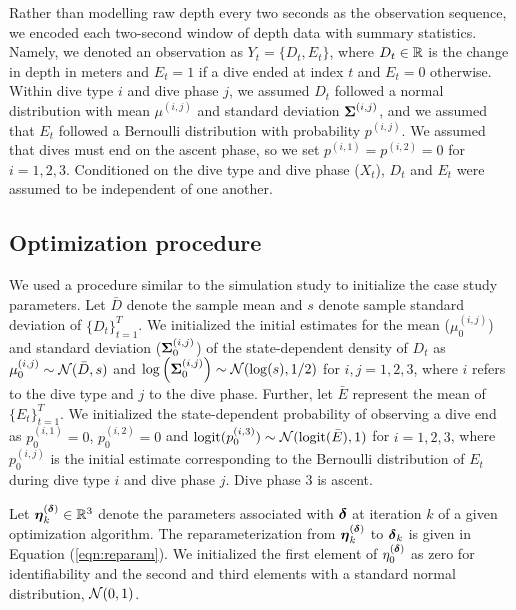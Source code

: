 Rather than modelling raw depth every two seconds as the observation sequence, we encoded each two-second window of depth data with summary statistics. Namely, we denoted an observation as $Y_t = \{D_t,E_t\}$, where $D_t \in \mathbb{R}$ is the change in depth in meters and $E_t = 1$ if a dive ended at index $t$ and $E_t = 0$ otherwise. 
Within dive type $i$ and dive phase $j$, we assumed $D_t$ followed a normal distribution with mean $\mu^{(i,j)}$ and standard deviation $\boldsymbol{\Sigma}^{(i,j)}$, and we assumed that $E_t$ followed a Bernoulli distribution with probability $p^{(i,j)}$. We assumed that dives must end on the ascent phase, so we set $p^{(i,1)} = p^{(i,2)} = 0$ for $i = 1,2,3$. Conditioned on the dive type and dive phase ($X_t$), $D_t$ and $E_t$ were assumed to be independent of one another.

\subsection{Optimization procedure}

We used a procedure similar to the simulation study to initialize the case study parameters. Let $\bar D$ denote the sample mean and $s$ denote sample standard deviation of $\{D_t\}_{t=1}^T$. We initialized the initial estimates for the mean ($\mu^{(i,j)}_0$) and standard deviation ($\boldsymbol{\Sigma}^{(i,j)}_0$) of the state-dependent density of $D_t$ as
%
    $\mu^{(i,j)}_0 \sim \mathcal{N}(\bar D, s)$ and $\log\left(\boldsymbol{\Sigma}^{(i,j)}_0\right) \sim \mathcal{N}(\log(s),1/2)$ for $i,j = 1,2,3$,
%
where $i$ refers to the dive type and $j$ to the dive phase. Further, let $\bar E$ represent the mean of $\{E_t\}_{t=1}^T$. We initialized the state-dependent probability of observing a dive end as
%
    $p^{(i,1)}_0 = 0$, $p^{(i,2)}_0 = 0$ and $\operatorname*{logit}(p^{(i,3)}_0) \sim \mathcal{N}(\operatorname*{logit}(\bar E),1)$ for $i = 1,2,3$,
%
where $p^{(i,j)}_0$ is the initial estimate corresponding to the Bernoulli distribution of $E_t$ during dive type $i$ and dive phase $j$. Dive phase 3 is ascent.

Let $\boldsymbol{\eta}^{(\boldsymbol{\delta})}_k \in \mathbb{R}^3$ denote the parameters associated with $\boldsymbol{\delta}$ at iteration $k$ of a given optimization algorithm. The reparameterization from $\boldsymbol{\eta}^{(\boldsymbol{\delta})}_k$ to $\boldsymbol{\delta}_k$ is given in Equation (\ref{eqn:reparam}). We initialized the first element of $\eta^{(\boldsymbol{\delta})}_0$ as zero for identifiability and the second and third elements with a standard normal distribution, $\mathcal{N}(0,1)$.

